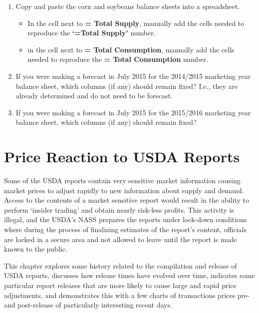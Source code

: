 \documentclass[
]{book}
\providecommand{\tightlist}{%
  \setlength{\itemsep}{0pt}\setlength{\parskip}{0pt}}
\begin{document}
\begin{enumerate}
\def\labelenumi{\arabic{enumi}.}
\item
  Copy and paste the corn and soybeans balance sheets into a spreadsheet.

  \begin{itemize}
  \tightlist
  \item
    In the cell next to \textbf{= Total Supply}, manually add the cells needed to reproduce the \textbf{`=Total Supply'} number.
  \item
    in the cell next to \textbf{= Total Consumption}, manually add the cells needed to reproduce the \textbf{= Total Consumption} number.
  \end{itemize}
\item
  If you were making a forecast in July 2015 for the 2014/2015 marketing year balance sheet, which columns (if any) should remain fixed? I.e., they are already determined and do not need to be forecast.
\item
  If you were making a forecast in July 2015 for the 2015/2016 marketing year balance sheet, which columns (if any) should remain fixed?
\end{enumerate}

\hypertarget{price-reaction-to-usda-reports}{%
\chapter{Price Reaction to USDA Reports}\label{price-reaction-to-usda-reports}}

Some of the USDA reports contain very sensitive market information causing market prices to adjust rapidly to new information about supply and demand. Access to the contents of a market sensitive report would result in the ability to perform `insider trading' and obtain nearly risk-less profits. This activity is illegal, and the USDA's NASS prepares the reports under lock-down conditions where during the process of finalizing estimates of the report's content, officials are locked in a secure area and not allowed to leave until the report is made known to the public.

This chapter explores some history related to the compilation and release of USDA reports, discusses how release times have evolved over time, indicates some particular report releases that are more likely to cause large and rapid price adjustments, and demonstrates this with a few charts of transactions prices pre- and post-release of particularly interesting recent days.
\end{document}
